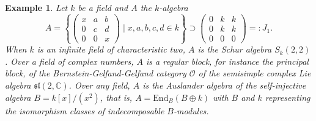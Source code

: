 \documentclass[oneside, a4paper, 11pt]{amsart}
\newtheorem{example}[theorem]{Example}
\newcommand{\End}{\mathrm{End}}
\begin{document}
\begin{example}\label{example}
Let $k$ be a field and $A$ the $k$-algebra 
$$A  = \left\{\left(\begin{array}{ccc} x & a & b\\ 0 & c & d \\ 0 & 0 & x\end{array}\right) \mid x,a,b,c,d\in k\right\} \supset 
\left(\begin{array}{ccc} 0 & k & k\\ 0 & k & k \\ 0 & 0 & 0\end{array}\right)=:J_1.$$
When $k$ is an infinite field of characteristic two, $A$ is the Schur algebra
$S_k(2,2)$. Over a field of complex numbers, $A$ is a regular block, for
instance the principal block, of the Bernstein-Gelfand-Gelfand category
$\mathcal{O}$ of the semisimple complex Lie algebra
${\mathfrak{sl}}(2,{\mathbb{C}})$. Over any field, $A$ is the Auslander algebra
of the self-injective algebra $B=k[x]/(x^2)$, that is,
$A = \End_B(B \oplus k)$ with $B$ and $k$ representing the isomorphism
classes of indecomposable $B$-modules.


\end{example}
\end{document}
